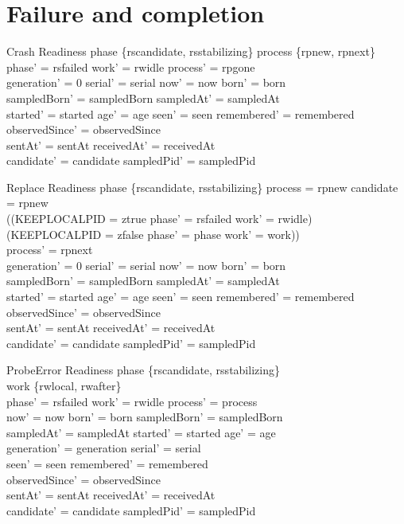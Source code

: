 \documentclass[a4paper,10pt,fleqn]{article}
\begin{document}
\section{Failure and completion}
\begin{schema}{Crash}
  \Delta Readiness
\where
  phase \in \{rscandidate, rsstabilizing\} \land process \in \{rpnew, rpnext\} \\
  phase' = rsfailed \land work' = rwidle \land process' = rpgone \\
  generation' = 0 \land serial' = serial \land now' = now \land born' = born \\
  sampledBorn' = sampledBorn \land sampledAt' = sampledAt \\
  started' = started \land age' = age \land seen' = seen
    \land remembered' = remembered \\
  observedSince' = observedSince \\
  sentAt' = sentAt \land receivedAt' = receivedAt \\
  candidate' = candidate \land sampledPid' = sampledPid
\end{schema}
\begin{schema}{Replace}
  \Delta Readiness
\where
  phase \in \{rscandidate, rsstabilizing\} \land process = rpnew \land candidate = rpnew \\
  ((KEEPLOCALPID = ztrue \land phase' = rsfailed \land work' = rwidle) \lor
  \quad~ (KEEPLOCALPID = zfalse \land phase' = phase \land work' = work)) \\
  process' = rpnext \\
  generation' = 0 \land serial' = serial \land now' = now \land born' = born \\
  sampledBorn' = sampledBorn \land sampledAt' = sampledAt \\
  started' = started \land age' = age \land seen' = seen
    \land remembered' = remembered \\
  observedSince' = observedSince \\
  sentAt' = sentAt \land receivedAt' = receivedAt \\
  candidate' = candidate \land sampledPid' = sampledPid
\end{schema}
\begin{schema}{ProbeError}
  \Delta Readiness
\where
  phase \in \{rscandidate, rsstabilizing\} \\
  work \in \{rwlocal, rwafter\} \\
  phase' = rsfailed \land work' = rwidle \land process' = process \\
  now' = now \land born' = born \land sampledBorn' = sampledBorn \\
  sampledAt' = sampledAt \land started' = started \land age' = age \\
  generation' = generation \land serial' = serial \\
  seen' = seen \land remembered' = remembered \\
  observedSince' = observedSince \\
  sentAt' = sentAt \land receivedAt' = receivedAt \\
  candidate' = candidate \land sampledPid' = sampledPid
\end{schema}
\end{document}
